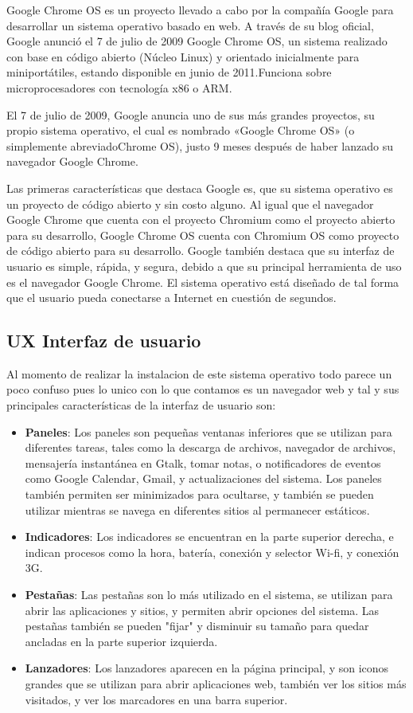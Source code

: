 \documentclass[paper=a4, fontsize=12pt]{article} 		%
\numberwithin{equation}{section}						%
\numberwithin{table}{section} 							%
\begin{document}
Google Chrome OS es un proyecto llevado a cabo por la compañía Google para desarrollar un sistema operativo basado en web. A través de su blog oficial, Google anunció el 7 de julio de 2009 Google Chrome OS, un sistema realizado con base en código abierto (Núcleo Linux) y orientado inicialmente para miniportátiles, estando disponible en junio de 2011.Funciona sobre microprocesadores con tecnología x86 o ARM.


El 7 de julio de 2009, Google anuncia uno de sus más grandes proyectos, su propio sistema operativo, el cual es nombrado «Google Chrome OS» (o simplemente abreviadoChrome OS), justo 9 meses después de haber lanzado su navegador Google Chrome.

Las primeras características que destaca Google es, que su sistema operativo es un proyecto de código abierto y sin costo alguno. Al igual que el navegador Google Chrome que cuenta con el proyecto Chromium como el proyecto abierto para su desarrollo, Google Chrome OS cuenta con Chromium OS como proyecto de código abierto para su desarrollo. Google también destaca que su interfaz de usuario es simple, rápida, y segura, debido a que su principal herramienta de uso es el navegador Google Chrome. El sistema operativo está diseñado de tal forma que el usuario pueda conectarse a Internet en cuestión de segundos.
\subsection{UX Interfaz de usuario}
Al momento de realizar la instalacion de este sistema operativo todo parece un poco confuso pues lo unico con lo que contamos es un navegador web y tal y sus principales características de la interfaz de usuario son:
\begin{itemize}
\item \textbf{Paneles}: Los paneles son pequeñas ventanas inferiores que se utilizan para diferentes tareas, tales como la descarga de archivos, navegador de archivos, mensajería instantánea en Gtalk, tomar notas, o notificadores de eventos como Google Calendar, Gmail, y actualizaciones del sistema. Los paneles también permiten ser minimizados para ocultarse, y también se pueden utilizar mientras se navega en diferentes sitios al permanecer estáticos.
\item \textbf{Indicadores}: Los indicadores se encuentran en la parte superior derecha, e indican procesos como la hora, batería, conexión y selector Wi-fi, y conexión 3G.
\item \textbf{Pestañas}: Las pestañas son lo más utilizado en el sistema, se utilizan para abrir las aplicaciones y sitios, y permiten abrir opciones del sistema. Las pestañas también se pueden "fijar" y disminuir su tamaño para quedar ancladas en la parte superior izquierda.
\item \textbf{Lanzadores}: Los lanzadores aparecen en la página principal, y son iconos grandes que se utilizan para abrir aplicaciones web, también ver los sitios más visitados, y ver los marcadores en una barra superior.
\end{itemize}
\end{document}
